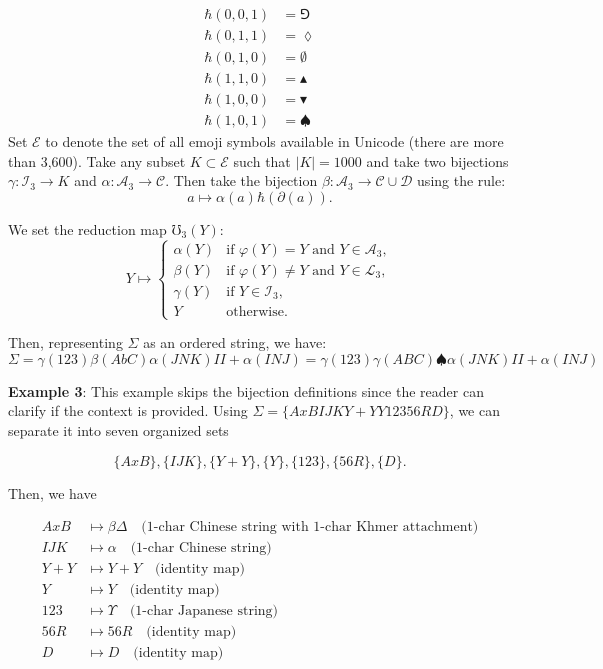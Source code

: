 \documentclass[amsmath,12pt,a4paper]{amsart}
\begin{document}
 \begin{equation*}
\begin{split}
\hbar(0,0,1) & = \Game\\
\hbar(0,1,1) & = \lozenge\\
\hbar(0,1,0) & = \emptyset\\
\hbar(1,1,0) & = \blacktriangle\\
\hbar(1,0,0) & = \blacktriangledown\\
\hbar(1,0,1) & = \spadesuit
\end{split}
\end{equation*} Set $\mathcal{E}$ to denote the set of all emoji symbols available in Unicode (there are more than 3,600). Take any subset $K \subset \mathcal{E}$ such that $|K| = 1000$ and take two bijections $\gamma : \mathcal{I}_3 \to K$ and $\alpha : \mathcal{A}_3 \to \mathcal{C}$. Then take the bijection $\beta : \mathcal{A}_3 \to \mathcal{C} \cup \mathcal{D}$ using the rule:
$$
a \mapsto \alpha(a) \hbar \left( \partial(a) \right).
$$

We set the reduction map $\mho_3(Y)$:
\begin{equation}
Y \mapsto 
\begin{cases}
\alpha(Y) & \text{if } \varphi(Y) = Y \text{ and } Y \in \mathcal{A}_3, \\
\beta(Y)  & \text{if } \varphi(Y) \neq Y \text{ and } Y \in \mathcal{L}_3, \\
\gamma(Y) & \text{if } Y \in \mathcal{I}_3, \\
Y         & \text{otherwise}.
\end{cases}
\end{equation}

Then, representing $\Sigma$ as an ordered string, we have:
$$
\Sigma  = \gamma(123) \beta(AbC) \alpha(JNK) II + \alpha(INJ) =  \gamma(123) \gamma(ABC)\spadesuit \alpha(JNK) II + \alpha(INJ)$$


\textbf{Example 3}:
This example skips the bijection definitions since the reader can clarify if the context is provided. Using $\Sigma = \{AxBIJKY + YY12356RD\}$, we can separate it into seven organized sets

$$
\{AxB\}, \{IJK\}, \{Y + Y\}, \{Y\}, \{123\}, \{56R\}, \{D\}.
$$

Then, we have

\begin{align*}
AxB & \mapsto \beta \Delta \quad \text{(1-char Chinese string with 1-char Khmer attachment)} \\
IJK & \mapsto \alpha \quad \text{(1-char Chinese string)} \\
Y + Y & \mapsto Y + Y \quad \text{(identity map)} \\
Y & \mapsto Y \quad \text{(identity map)} \\
123 & \mapsto \Upsilon \quad \text{(1-char Japanese string)} \\
56R & \mapsto 56R \quad \text{(identity map)} \\
D & \mapsto D \quad \text{(identity map)} \\
\end{align*}
\end{document}
